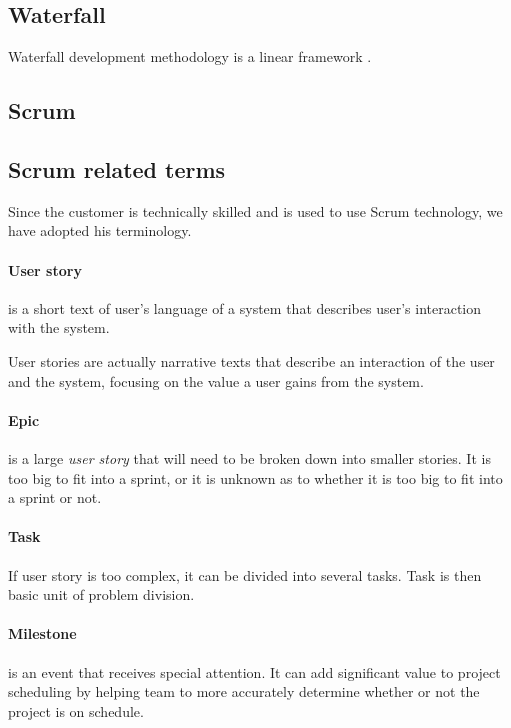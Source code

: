 \subsection{Waterfall}
Waterfall development methodology is a linear framework \cite{selectingMethodology}.


\subsection{Scrum}

\subsection{Scrum related terms}

Since the customer is technically skilled and is used to use Scrum technology, we have adopted his terminology.
\paragraph{User story}
is a short text of user's language of a system that describes user's interaction with the system.

User stories are actually narrative texts that describe an interaction of the user and the system, focusing on the value a user gains from the system.

\paragraph{Epic}
is a large \emph{user story} that will need to be broken down into smaller stories. It is too big to fit into a sprint, or it is unknown as to whether it is too big to fit into a sprint or not.

\paragraph{Task}
If user story is too complex, it can be divided into several tasks. 
Task is then basic unit of problem division.


\paragraph{Milestone}
 is an event that receives special attention. It can add significant value to project scheduling by helping team to more accurately determine whether or not the project is on schedule.


